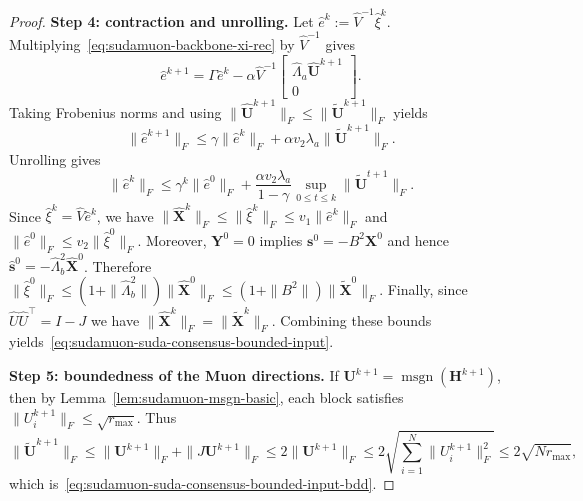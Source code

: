\documentclass[10pt,a4paper]{amsart}
\begin{document}
\begin{proof}
\medskip\noindent\textbf{Step 4: contraction and unrolling.}
Let $\hat e^k:=\hat V^{-1}\hat\xi^k$.
Multiplying~\eqref{eq:sudamuon-backbone-xi-rec} by $\hat V^{-1}$ gives
\[
\hat e^{k+1}=\Gamma\hat e^k-\alpha\hat V^{-1}\begin{bmatrix}\hat\Lambda_a\hat{\mathbf U}^{k+1}\\0\end{bmatrix}.
\]
Taking Frobenius norms and using $\|\hat{\mathbf U}^{k+1}\|_F\le \|\tilde{\mathbf U}^{k+1}\|_F$ yields
\[
\|\hat e^{k+1}\|_F\le \gamma\|\hat e^k\|_F+\alpha v_2\lambda_a\|\tilde{\mathbf U}^{k+1}\|_F.
\]
Unrolling gives
\[
\|\hat e^{k}\|_F\le \gamma^k\|\hat e^0\|_F+\frac{\alpha v_2\lambda_a}{1-\gamma}\sup_{0\le t\le k}\|\tilde{\mathbf U}^{t+1}\|_F.
\]
Since $\hat\xi^k=\hat V\hat e^k$, we have $\|\hat{\mathbf X}^k\|_F\le \|\hat\xi^k\|_F\le v_1\|\hat e^k\|_F$ and $\|\hat e^0\|_F\le v_2\|\hat\xi^0\|_F$.
Moreover, $\mathbf Y^0=0$ implies $\mathbf s^0=-B^2\mathbf X^0$ and hence $\hat{\mathbf s}^0=-\hat\Lambda_b^2\hat{\mathbf X}^0$.
Therefore $\|\hat\xi^0\|_F\le (1+\|\hat\Lambda_b^2\|)\|\hat{\mathbf X}^0\|_F\le (1+\|B^2\|)\|\tilde{\mathbf X}^0\|_F$.
Finally, since $\hat U\hat U^\top=I-J$ we have $\|\hat{\mathbf X}^k\|_F=\|\tilde{\mathbf X}^k\|_F$.
Combining these bounds yields~\eqref{eq:sudamuon-suda-consensus-bounded-input}.

\medskip\noindent\textbf{Step 5: boundedness of the Muon directions.}
If $\mathbf{U}^{k+1}=\operatorname{msgn}(\mathbf{H}^{k+1})$, then by Lemma~\ref{lem:sudamuon-msgn-basic}, each block satisfies $\|U_i^{k+1}\|_F\le\sqrt{r_{\max}}$.
Thus
\[
\|\tilde{\mathbf{U}}^{k+1}\|_F
\le \|\mathbf U^{k+1}\|_F+\|J\mathbf U^{k+1}\|_F
\le 2\|\mathbf U^{k+1}\|_F
\le 2\sqrt{\sum_{i=1}^N\|U_i^{k+1}\|_F^2}
\le 2\sqrt{Nr_{\max}},
\]
which is~\eqref{eq:sudamuon-suda-consensus-bounded-input-bdd}.
\end{proof}
\end{document}
